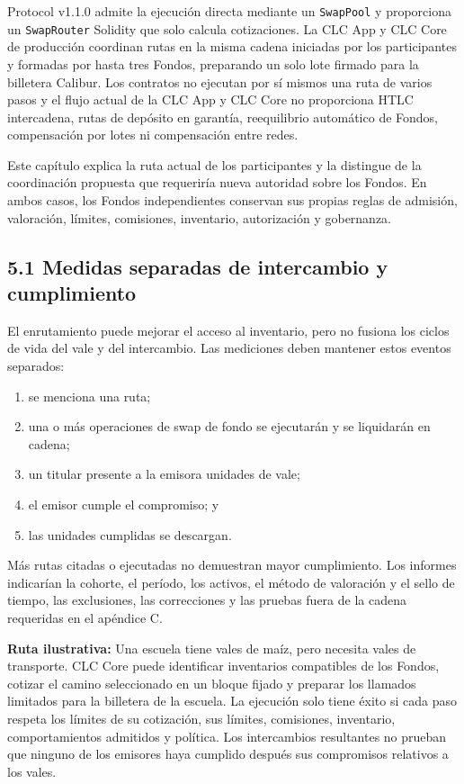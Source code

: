 \documentclass[11pt]{article}
\begin{document}
Protocol v1.1.0 admite la ejecución directa mediante un \texttt{SwapPool} y proporciona un \texttt{SwapRouter} Solidity que solo calcula cotizaciones. La CLC App y CLC Core de producción coordinan rutas en la misma cadena iniciadas por los participantes y formadas por hasta tres Fondos, preparando un solo lote firmado para la billetera Calibur. Los contratos no ejecutan por sí mismos una ruta de varios pasos y el flujo actual de la CLC App y CLC Core no proporciona HTLC intercadena, rutas de depósito en garantía, reequilibrio automático de Fondos, compensación por lotes ni compensación entre redes.

Este capítulo explica la ruta actual de los participantes y la distingue de la coordinación propuesta que requeriría nueva autoridad sobre los Fondos. En ambos casos, los Fondos independientes conservan sus propias reglas de admisión, valoración, límites, comisiones, inventario, autorización y gobernanza.

\subsection*{5.1 Medidas separadas de intercambio y cumplimiento}

El enrutamiento puede mejorar el acceso al inventario, pero no fusiona los ciclos de vida del vale y del intercambio. Las mediciones deben mantener estos eventos separados:

\begin{enumerate}[leftmargin=*]
\item se menciona una ruta;
\item una o más operaciones de swap de fondo se ejecutarán y se liquidarán en cadena;
\item un titular presente a la emisora unidades de vale;
\item el emisor cumple el compromiso; y
\item las unidades cumplidas se descargan.
\end{enumerate}
Más rutas citadas o ejecutadas no demuestran mayor cumplimiento. Los informes indicarían la cohorte, el período, los activos, el método de valoración y el sello de tiempo, las exclusiones, las correcciones y las pruebas fuera de la cadena requeridas en el apéndice C.

\textbf{Ruta ilustrativa:} Una escuela tiene vales de maíz, pero necesita vales de transporte. CLC Core puede identificar inventarios compatibles de los Fondos, cotizar el camino seleccionado en un bloque fijado y preparar los llamados limitados para la billetera de la escuela. La ejecución solo tiene éxito si cada paso respeta los límites de su cotización, sus límites, comisiones, inventario, comportamientos admitidos y política. Los intercambios resultantes no prueban que ninguno de los emisores haya cumplido después sus compromisos relativos a los vales.
\end{document}
